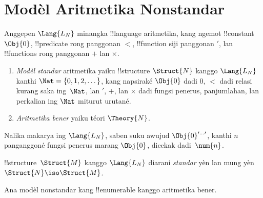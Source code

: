 \documentclass[../../../include/open-logic-section]{subfiles}
\begin{document}
\section{Modèl Aritmetika Nonstandar}

\begin{defn}
Anggepen $\Lang{L_N}$ minangka !!{language} aritmetika,
kang ngemot !!{constant} $\Obj{0}$, !!{predicate} rong panggonan
$<$, !!{function} siji panggonan $\prime$, lan
!!{function}s rong panggonan $+$ lan $\times$.
\begin{enumerate}
\item \emph{Modèl standar} aritmetika yaiku !!{structure}
  $\Struct{N}$ kanggo $\Lang{L_N}$ kanthi
  $\Nat = \{ 0, 1, 2, \dots\}$, kang napsiraké
  $\Obj{0}$ dadi $0$, $<$ dadi relasi kurang saka
  ing~$\Nat$, lan $\prime$, $+$, lan $\times$
  dadi fungsi penerus, panjumlahan, lan perkalian
  ing $\Nat$ miturut urutané.
\item \emph{Aritmetika bener} yaiku téori $\Theory{N}$.
\end{enumerate}
\end{defn}

Nalika makarya ing $\Lang{L_N}$, saben suku awujud
$\Obj{0}^{\prime\dots\prime}$, kanthi $n$ panganggoné
fungsi penerus marang $\Obj{0}$, dicekak dadi~$\num{n}$.

\begin{defn}
!!{structure}~$\Struct{M}$ kanggo $\Lang{L_N}$ diarani
\emph{standar} yèn lan mung yèn $\Struct{N} \iso \Struct{M}$.
\end{defn}

\begin{thm}
Ana modèl nonstandar kang !!{enumerable} kanggo aritmetika bener.
\end{thm}
\end{document}

